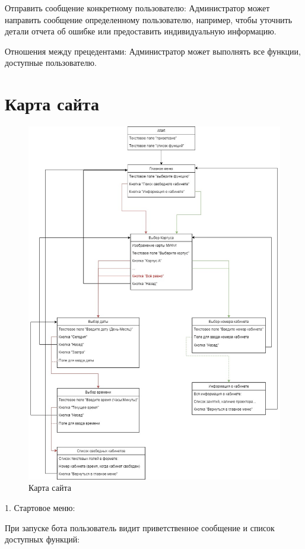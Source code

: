 Отправить сообщение конкретному пользователю: Администратор может направить
сообщение определенному пользователю, например, чтобы уточнить детали отчета об
ошибке или предоставить индивидуальную информацию.

Отношения между прецедентами:
Администратор может выполнять все функции, доступные пользователю.

\chapter{Карта сайта}

\begin{figure}[h]
    \centering
    \includegraphics[scale=0.45]{img/map}
    \caption{Карта сайта}
    \label{fig:cp}
\end{figure}

1. Стартовое меню:

При запуске бота пользователь видит приветственное сообщение и список доступных
функций:

